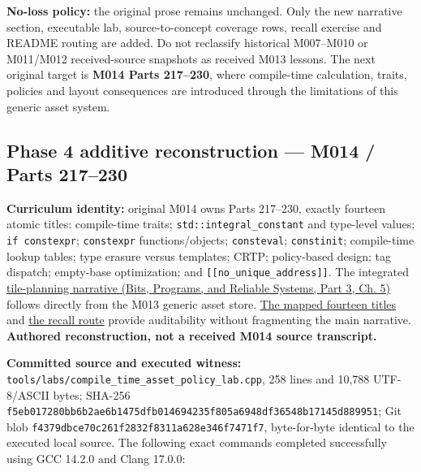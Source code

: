 \textbf{No-loss policy:} the original prose remains unchanged. Only the new narrative section, executable lab, source-to-concept coverage rows, recall exercise and README routing are added. Do not reclassify historical M007--M010 or M011/M012 received-source snapshots as received M013 lessons. The next original target is \textbf{M014 Parts 217--230}, where compile-time calculation, traits, policies and layout consequences are introduced through the limitations of this generic asset system.

\subsection{Phase 4 additive reconstruction --- M014 / Parts 217--230}\label{appendix-a103e7846d21-phase-4-additive-reconstruction-m014-parts-217230}

\hypertarget{appendix-a103e7846d21-phase-4-additive-reconstruction-m014-parts-217230}{}

\textbf{Curriculum identity:} original M014 owns Parts 217--230, exactly fourteen atomic titles: compile-time traits; \texttt{std::integral\_constant} and type-level values; \texttt{if\ constexpr}; \texttt{constexpr} functions/objects; \texttt{consteval}; \texttt{constinit}; compile-time lookup tables; type erasure versus templates; CRTP; policy-based design; tag dispatch; empty-base optimization; and \texttt{{[}{[}no\_unique\_address{]}{]}}. The integrated \href{../01-Bits-Programs-and-Reliable-Systems-P03/main.pdf\#nameddest=01-foundations-i-ch005-a-texture-tile-that-chooses-its-work-before-the-frame-begins}{tile-planning narrative (Bits, Programs, and Reliable Systems, Part 3, Ch. 5)} follows directly from the M013 generic asset store. \hyperref[appendix-fd090d982a15-m014-parts-217230-one-tile-planner-and-its-compile-time-policy-decisions]{The mapped fourteen titles} and \hyperref[appendix-960160274237-the-tile-planner-makes-a-choice-m014-reconstruction]{the recall route} provide auditability without fragmenting the main narrative. \textbf{Authored reconstruction, not a received M014 source transcript.}

\textbf{Committed source and executed witness:} \texttt{tools/labs/compile\_time\_asset\_policy\_lab.cpp}, 258 lines and 10,788 UTF-8/ASCII bytes; SHA-256 \texttt{f5eb017280bb6b2ae6b1475dfb014694235f805a6948df36548b17145d889951}; Git blob \texttt{f4379dbce70c261f2832f8311a628e346f7471f7}, byte-for-byte identical to the executed local source. The following exact commands completed successfully using GCC 14.2.0 and Clang 17.0.0:

